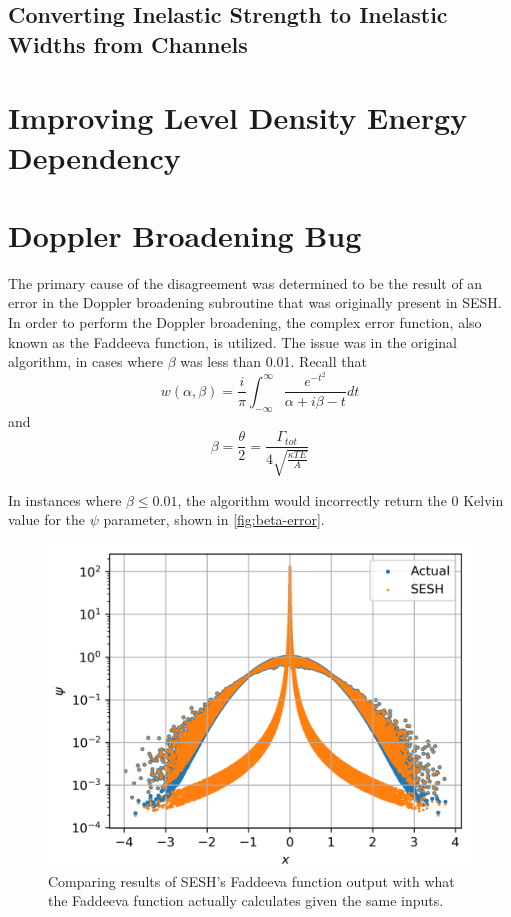     \subsection{Converting Inelastic Strength to Inelastic Widths from Channels}

\section{Improving Level Density Energy Dependency}

\section{Doppler Broadening Bug}
    The primary cause of the disagreement was determined to be the result of an error in the Doppler broadening subroutine that was originally present in SESH. In order to perform the Doppler broadening, the complex error function, also known as the Faddeeva function, is utilized. The issue was in the original algorithm, in cases where $\beta$ was less than 0.01. Recall that
    \begin{equation}
        w(\alpha,\beta) = \frac{i}{\pi} \int_{-\infty}^{\infty} \frac{e^{-t^2}}{\alpha + i\beta - t}dt
    \end{equation}
    and
    \begin{equation}
        \beta = \frac{\theta}{2} = \frac{\Gamma_{tot}}{4\sqrt{\frac{ \kappa T E}{A}}}
        \label{eq:doppler-beta}
    \end{equation}

    In instances where $\beta \leq 0.01$, the algorithm would incorrectly return the 0 Kelvin value for the $\psi$ parameter, shown in \autoref{fig:beta-error}.
    \begin{figure}
        \centering
        \includegraphics[width=0.95\linewidth]{Implementation/Figures/beta-error.png}
        \caption{Comparing results of SESH's Faddeeva function output with what the Faddeeva function actually calculates given the same inputs.}
        \label{fig:beta-error}
    \end{figure}
    
